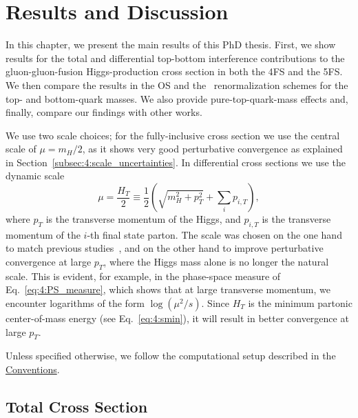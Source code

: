 
\chapter{Results and Discussion}\label{chap:six}

In this chapter, we present the main results of this PhD thesis. First, we show results for the total and differential top-bottom interference contributions to the gluon-gluon-fusion Higgs-production cross section in both the 4\acs{FS} and the 5\acs{FS}. We then compare the results in the \acs{OS} and the \MS\ renormalization schemes for the top- and bottom-quark masses. We also provide pure-top-quark-mass effects and, finally, compare our findings with other works.

We use two scale choices; for the fully-inclusive cross section we use the central scale of $\mu = m_H/2$, as it shows very good perturbative convergence as explained in Section~\ref{subsec:4:scale_uncertainties}. In differential cross sections we use the dynamic scale
\begin{equation}
\mu = \frac{H_T}{2} \equiv \frac{1}{2} \left( \sqrt{m_H^2 + p_T^2} + \sum_i p_{i, T} \right),
\label{eq:6:mu_dynamic}
\end{equation}
where $p_T$ is the transverse momentum of the Higgs, and $p_{i, T}$ is the transverse momentum of the $i$-th final state parton. The scale was chosen on the one hand to match previous studies~\cite{Lindert:2017pky, Bonciani:2022jmb, Jones:2018hbb}, and on the other hand to improve perturbative convergence at large $p_T$, where the Higgs mass alone is no longer the natural scale. This is evident, for example, in the phase-space measure of Eq.~\eqref{eq:4:PS_measure}, which shows that at large transverse momentum, we encounter logarithms of the form $\log (\mu^2/s)$. Since $H_T$ is the minimum partonic center-of-mass energy (see Eq.~\eqref{eq:4:smin}), it will result in better convergence at large $p_T$.

Unless specified otherwise, we follow the computational setup described in the \hyperref[chap:notation_and_conventions]{Conventions}.
\section{Total Cross Section}
